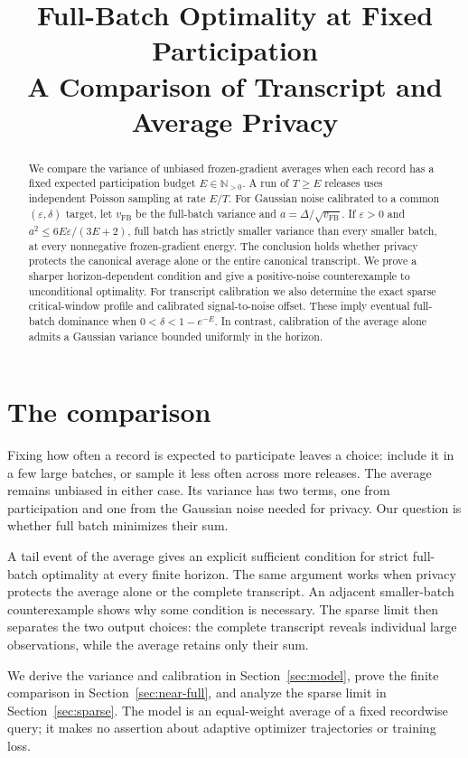 \documentclass[11pt]{article}
\title{Full-Batch Optimality at Fixed Participation\\
A Comparison of Transcript and Average Privacy}
\author{}
\date{}
\theoremstyle{remark}
\newcommand{\N}{\mathbb N}
\begin{document}
\maketitle

\begin{abstract}
We compare the variance of unbiased frozen-gradient averages when each record
has a fixed expected participation budget $E\in\N_{>0}$. A run of $T\geq E$ releases
uses independent Poisson sampling at rate $E/T$. For Gaussian noise calibrated
to a common $(\varepsilon,\delta)$ target, let $v_{\mathrm{FB}}$ be the
full-batch variance and $a=\Delta/\sqrt{v_{\mathrm{FB}}}$.
If $\varepsilon>0$ and
$a^2\leq6E\varepsilon/(3E+2)$, full batch has strictly smaller variance
than every smaller batch, at every nonnegative frozen-gradient energy.
The conclusion holds whether privacy protects the canonical average alone
or the entire canonical transcript. We prove a sharper horizon-dependent
condition and give a positive-noise counterexample to unconditional optimality.
For transcript calibration we also determine the exact sparse critical-window
profile and calibrated signal-to-noise offset. These imply eventual full-batch
dominance when $0<\delta<1-e^{-E}$. In contrast, calibration of the average
alone admits a Gaussian variance bounded uniformly in the horizon.
\end{abstract}

\section{The comparison}
Fixing how often a record is expected to participate leaves a choice: include
it in a few large batches, or sample it less often across more releases.
The average remains unbiased in either case. Its variance has two terms,
one from participation and one from the Gaussian noise needed for privacy.
Our question is whether full batch minimizes their sum.

A tail event of the average gives an explicit sufficient condition for strict
full-batch optimality at every finite horizon. The same argument works when
privacy protects the average alone or the complete transcript. An adjacent
smaller-batch counterexample shows why some condition is necessary.
The sparse limit then separates the two output choices: the complete transcript
reveals individual large observations, while the average retains only their sum.

We derive the variance and calibration in Section~\ref{sec:model}, prove the
finite comparison in Section~\ref{sec:near-full}, and analyze the sparse limit
in Section~\ref{sec:sparse}. The model is an equal-weight average of a fixed
recordwise query; it makes no assertion about adaptive optimizer trajectories
or training loss.
\end{document}
